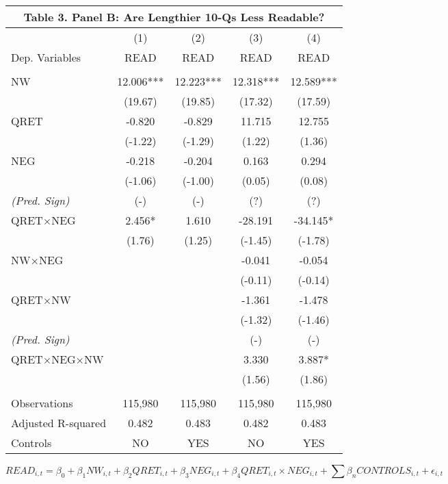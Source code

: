 \begin{table}[H] \label{T3PB}
	\begin{center}
		\begin{tabular}{lcccc}
			\multicolumn{5}{c}{\textbf{Table 3. Panel B: Are Lengthier 10-Qs Less Readable?}} \\
			\midrule
			\midrule
			& (1) & (2) & (3) & (4) \\
			Dep. Variables & READ & READ & READ & READ \\
			\midrule
			&   &   &   &  \\
			NW & 12.006*** & 12.223*** & 12.318*** & 12.589*** \\
			& (19.67) & (19.85) & (17.32) & (17.59) \\
			QRET & -0.820 & -0.829 & 11.715 & 12.755 \\
			& (-1.22) & (-1.29) & (1.22) & (1.36) \\
			NEG & -0.218 & -0.204 & 0.163 & 0.294 \\
			& (-1.06) & (-1.00) & (0.05) & (0.08) \\
			\rowcolor[rgb]{ .933,  .925,  .882}\textit{(Pred. Sign)} & (-) & (-) & (?) & (?) \\
			\rowcolor[rgb]{ .933,  .925,  .882} QRET$\times$NEG & 2.456* & 1.610 & -28.191 & -34.145* \\
			\rowcolor[rgb]{ .933,  .925,  .882} & (1.76) & (1.25) & (-1.45) & (-1.78) \\
			NW$\times$NEG &   &   & -0.041 & -0.054 \\
			&   &   & (-0.11) & (-0.14) \\
			QRET$\times$NW &   &   & -1.361 & -1.478 \\
			&   &   & (-1.32) & (-1.46) \\
			\rowcolor[rgb]{ .933,  .925,  .882} \textit{(Pred. Sign)} & & &  (-) &  (-)\\
			\rowcolor[rgb]{ .933,  .925,  .882} QRET$\times$NEG$\times$NW &   &   & 3.330 & 3.887* \\
			\rowcolor[rgb]{ .933,  .925,  .882} &   &  & (1.56) & (1.86) \\
			&   &   &   &  \\
			Observations & 115,980 & 115,980 & 115,980 & 115,980 \\
			Adjusted R-squared & 0.482 & 0.483 & 0.482 & 0.483 \\
			Controls & NO & YES & NO & YES \\
			\bottomrule
			\bottomrule
		\end{tabular}%
	\end{center}
		\begin{footnotesize}
			\setcounter{equation}{0}
			\begin{equation*}
				READ_{i,t}=\beta_0+\beta_1NW_{i,t}+\beta_2QRET_{i,t}+\beta_3NEG_{i,t}+\beta_4QRET_{i,t}\times NEG_{i,t}+\sum\beta_nCONTROLS_{i,t}+\epsilon_{i,t}
			\end{equation*}
			

\end{footnotesize}
\end{table}
